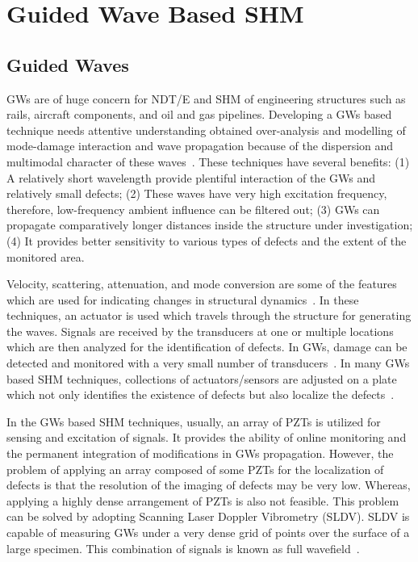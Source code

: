 \documentclass[b5paper, 11pt, titlepage]{book}
\begin{document}
\section{Guided Wave Based SHM}
\subsection{Guided Waves}

GWs are of huge concern for NDT/E and SHM of engineering structures such as rails, aircraft components, and oil and gas pipelines. Developing a GWs based technique needs attentive understanding obtained over-analysis and modelling of mode-damage interaction and wave propagation because of the dispersion and multimodal character of these waves~\cite{Lugovtsova2019}. These techniques have several benefits: (1) A relatively short wavelength provide plentiful interaction of the GWs and relatively small defects; (2) These waves have very high excitation frequency, therefore, low-frequency ambient influence can be filtered out; (3)  GWs can propagate comparatively longer distances inside the structure under investigation; (4) It provides better sensitivity to various types of defects and the extent of the monitored area.

Velocity, scattering, attenuation, and mode conversion are some of the features which are used for indicating changes in structural dynamics~\cite{Wang2020,Mitra2016}. In these techniques, an actuator is used which travels through the structure for generating the waves. Signals are received by the transducers at one or multiple locations which are then analyzed for the identification of defects. In GWs, damage can be detected and monitored with a very small number of transducers~\cite{Munian2018}. In many GWs based SHM techniques, collections of actuators/sensors are adjusted on a plate which not only identifies the existence of defects but also localize the defects~\cite{Farrar2012}.

In the GWs based SHM techniques, usually, an array of PZTs is utilized for sensing and excitation of signals. It provides the ability of online monitoring and the permanent integration of modifications in GWs propagation. However, the problem of applying an array composed of some PZTs for the localization of defects is that the resolution of the imaging of defects may be very low. Whereas, applying a highly dense arrangement of PZTs is also not feasible. This problem can be solved by adopting Scanning Laser Doppler Vibrometry (SLDV). SLDV is capable of measuring GWs under a very dense grid of points over the surface of a large specimen. This combination of signals is known as full wavefield~\cite{Wandowski2011,Radzienski2019}.
\end{document}
